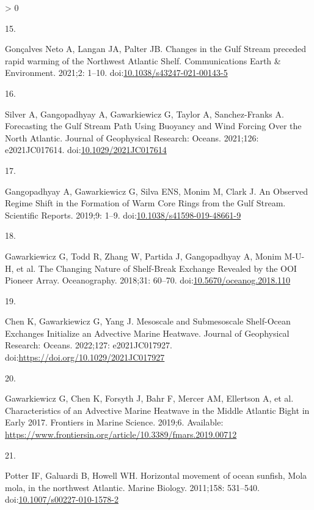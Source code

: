 \documentclass[
  10pt,
]{article}
\newlength{\cslhangindent}
\newlength{\csllabelwidth}
\newenvironment{CSLReferences}[2] %
 {%
  \setlength{\parindent}{0pt}
  \ifodd #1 \everypar{\setlength{\hangindent}{\cslhangindent}}\ignorespaces\fi
  \ifnum #2 > 0
  \setlength{\parskip}{#2\baselineskip}
  \fi
 }%
 {}
\newcommand{\CSLLeftMargin}[1]{\parbox[t]{\csllabelwidth}{#1}}
\newcommand{\CSLRightInline}[1]{\parbox[t]{\linewidth - \csllabelwidth}{#1}\break}
\begin{document}
\begin{CSLReferences}{0}{0}
\leavevmode\hypertarget{ref-goncalves_neto_changes_2021}{}%
\CSLLeftMargin{15. }
\CSLRightInline{Gonçalves Neto A, Langan JA, Palter JB. Changes in the
{Gulf} {Stream} preceded rapid warming of the {Northwest} {Atlantic}
{Shelf}. Communications Earth \& Environment. 2021;2: 1--10.
doi:\href{https://doi.org/10.1038/s43247-021-00143-5}{10.1038/s43247-021-00143-5}}

\leavevmode\hypertarget{ref-silver_forecasting_2021}{}%
\CSLLeftMargin{16. }
\CSLRightInline{Silver A, Gangopadhyay A, Gawarkiewicz G, Taylor A,
Sanchez-Franks A. Forecasting the {Gulf} {Stream} {Path} {Using}
{Buoyancy} and {Wind} {Forcing} {Over} the {North} {Atlantic}. Journal
of Geophysical Research: Oceans. 2021;126: e2021JC017614.
doi:\href{https://doi.org/10.1029/2021JC017614}{10.1029/2021JC017614}}

\leavevmode\hypertarget{ref-gangopadhyay_observed_2019}{}%
\CSLLeftMargin{17. }
\CSLRightInline{Gangopadhyay A, Gawarkiewicz G, Silva ENS, Monim M,
Clark J. An {Observed} {Regime} {Shift} in the {Formation} of {Warm}
{Core} {Rings} from the {Gulf} {Stream}. Scientific Reports. 2019;9:
1--9.
doi:\href{https://doi.org/10.1038/s41598-019-48661-9}{10.1038/s41598-019-48661-9}}

\leavevmode\hypertarget{ref-gawarkiewicz_changing_2018}{}%
\CSLLeftMargin{18. }
\CSLRightInline{Gawarkiewicz G, Todd R, Zhang W, Partida J, Gangopadhyay
A, Monim M-U-H, et al. The {Changing} {Nature} of {Shelf}-{Break}
{Exchange} {Revealed} by the {OOI} {Pioneer} {Array}. Oceanography.
2018;31: 60--70.
doi:\href{https://doi.org/10.5670/oceanog.2018.110}{10.5670/oceanog.2018.110}}

\leavevmode\hypertarget{ref-chen_mesoscale_2022}{}%
\CSLLeftMargin{19. }
\CSLRightInline{Chen K, Gawarkiewicz G, Yang J. Mesoscale and
{Submesoscale} {Shelf}-{Ocean} {Exchanges} {Initialize} an {Advective}
{Marine} {Heatwave}. Journal of Geophysical Research: Oceans. 2022;127:
e2021JC017927. doi:\url{https://doi.org/10.1029/2021JC017927}}

\leavevmode\hypertarget{ref-gawarkiewicz_characteristics_2019}{}%
\CSLLeftMargin{20. }
\CSLRightInline{Gawarkiewicz G, Chen K, Forsyth J, Bahr F, Mercer AM,
Ellertson A, et al. Characteristics of an {Advective} {Marine}
{Heatwave} in the {Middle} {Atlantic} {Bight} in {Early} 2017. Frontiers
in Marine Science. 2019;6. Available:
\url{https://www.frontiersin.org/article/10.3389/fmars.2019.00712}}

\leavevmode\hypertarget{ref-potter_horizontal_2011}{}%
\CSLLeftMargin{21. }
\CSLRightInline{Potter IF, Galuardi B, Howell WH. Horizontal movement of
ocean sunfish, {Mola} mola, in the northwest {Atlantic}. Marine Biology.
2011;158: 531--540.
doi:\href{https://doi.org/10.1007/s00227-010-1578-2}{10.1007/s00227-010-1578-2}}


\end{CSLReferences}
\end{document}
